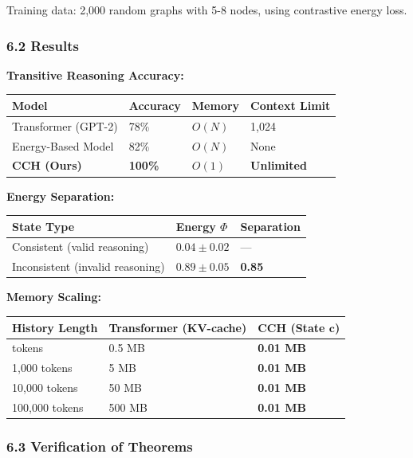 \documentclass[
  11pt,
  a4paper,
]{article}
\begin{document}
Training data: 2,000 random graphs with 5-8 nodes, using contrastive
energy loss.

\subsubsection{6.2 Results}\label{results}

\textbf{Transitive Reasoning Accuracy:}

\begin{longtable}[]{@{}llll@{}}
\toprule\noalign{}
Model & Accuracy & Memory & Context Limit \\
\midrule\noalign{}
\endhead
\bottomrule\noalign{}
\endlastfoot
Transformer (GPT-2) & 78\% & \(O(N)\) & 1,024 \\
Energy-Based Model & 82\% & \(O(N)\) & None \\
\textbf{CCH (Ours)} & \textbf{100\%} & \textbf{\(O(1)\)} &
\textbf{Unlimited} \\
\end{longtable}

\textbf{Energy Separation:}

\begin{longtable}[]{@{}lll@{}}
\toprule\noalign{}
State Type & Energy \(\Phi\) & Separation \\
\midrule\noalign{}
\endhead
\bottomrule\noalign{}
\endlastfoot
Consistent (valid reasoning) & \(0.04 \pm 0.02\) & --- \\
Inconsistent (invalid reasoning) & \(0.89 \pm 0.05\) & \textbf{0.85} \\
\end{longtable}

\textbf{Memory Scaling:}

\begin{longtable}[]{@{}lll@{}}
\toprule\noalign{}
History Length & Transformer (KV-cache) & CCH (State \(\mathbf{c}\)) \\
\midrule\noalign{}
\endhead
\bottomrule\noalign{}
\endlastfoot
100 tokens & 0.5 MB & \textbf{0.01 MB} \\
1,000 tokens & 5 MB & \textbf{0.01 MB} \\
10,000 tokens & 50 MB & \textbf{0.01 MB} \\
100,000 tokens & 500 MB & \textbf{0.01 MB} \\
\end{longtable}

\subsubsection{6.3 Verification of
Theorems}\label{verification-of-theorems}
\end{document}
